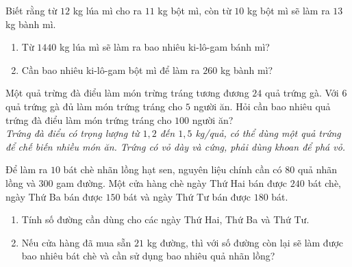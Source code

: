\begin{bt}%
	Biết rằng từ $12$ kg lúa mì cho ra $11$ kg bột mì, còn từ $10$ kg bột mì sẽ làm ra $13$ kg bành mì.
	\begin{enumerate}
		\item Từ $1440$ kg lúa mì sẽ làm ra bao nhiêu ki-lô-gam bánh mì?
		\item Cần bao nhiêu ki-lô-gam bột mì để làm ra $260$ kg bành mì?
	\end{enumerate}
\end{bt}

\begin{bt}%
	Một quả trừng đà điểu làm món trừng tráng tương đương $24$ quả trứng gà. Với $6$ quả trứng gà đủ làm món trứng tráng cho $5$ người ăn. Hỏi cần bao nhiêu quả trứng đà điểu làm món trứng tráng cho $100$ người ăn?\\
	\textit{Trứng đà điểu có trọng lượng từ $1,2$ đến $1,5$ kg/quả, có thể dùng một quả trứng để chế biến nhiều món ăn. Trứng có vỏ dày và cứng, phải dùng khoan để phá vỏ.}
\end{bt}

\begin{bt}%
	Để làm ra $10$ bát chè nhãn lồng hạt sen, nguyên liệu chính cần có $80$ quả nhãn lồng và $300$ gam đường. Một cửa hàng chè ngày Thứ Hai bán được $240$ bát chè, ngày Thứ Ba bán được $150$ bát và ngày Thứ Tư bán được $180$ bát.
	\begin{enumerate}
		\item Tính số đường cần dùng cho các ngày Thứ Hai, Thứ Ba và Thứ Tư.
		\item Nếu cửa hàng đã mua sẵn $21$ kg đường, thì với số đường còn lại sẽ làm được bao nhiêu bát chè và cần sử dụng bao nhiêu quả nhãn lồng?
	\end{enumerate}
\end{bt}

